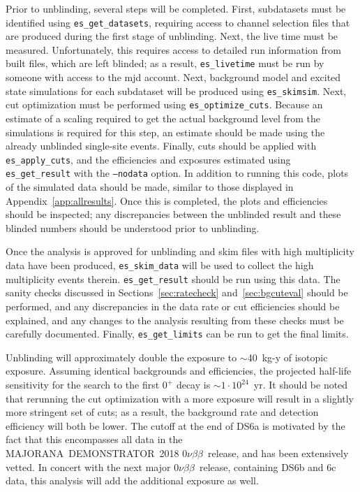 \documentclass[notitlepage,rmp,aps,10pt]{revtex4-1}
\newcommand{\MJ}{M{\footnotesize AJORANA}}
\newcommand{\Demo}{D{\footnotesize EMON\-STRAT\-OR}}
\newcommand{\MJD}{\MJ\ \Demo}
\newcommand{\znbb}{${0 \nu \beta \beta}$}
\begin{document}
Prior to unblinding, several steps will be completed.
First, subdatasets must be identified using \texttt{es\_get\_datasets}, requiring access to channel selection files that are produced during the first stage of unblinding.
Next, the live time must be measured. Unfortunately, this requires access to detailed run information from built files, which are left blinded; as a result, \texttt{es\_livetime} must be run by someone with access to the mjd account.
Next, background model and excited state simulations for each subdataset will be produced using \texttt{es\_skimsim}.
Next, cut optimization must be performed using \texttt{es\_optimize\_cuts}.
Because an estimate of a scaling required to get the actual background level from the simulations is required for this step, an estimate should be made using the already unblinded single-site events.
Finally, cuts should be applied with \texttt{es\_apply\_cuts}, and the efficiencies and exposures estimated using \texttt{es\_get\_result} with the \texttt{--nodata} option.
In addition to running this code, plots of the simulated data should be made, similar to those displayed in Appendix~\ref{app:allresults}.
Once this is completed, the plots and efficiencies should be inspected; any discrepancies between the unblinded result and these blinded numbers should be understood prior to unblinding.

Once the analysis is approved for unblinding and skim files with high multiplicity data have been produced, \texttt{es\_skim\_data} will be used to collect the high multiplicity events therein.
\texttt{es\_get\_result} should be run using this data.
The sanity checks discussed in Sections~\ref{sec:ratecheck} and~\ref{sec:bgcuteval} should be performed, and any discrepancies in the data rate or cut efficiencies should be explained, and any changes to the analysis resulting from these checks must be carefully documented.
Finally, \texttt{es\_get\_limits} can be run to get the final limits.

Unblinding will approximately double the exposure to $\sim$40~kg-y of isotopic exposure. Assuming identical backgrounds and efficiencies, the projected half-life sensitivity for the search to the first $0^+$ decay is $\sim1\cdot10^{24}$~yr. It should be noted that rerunning the cut optimization with a more exposure will result in a slightly more stringent set of cuts; as a result, the background rate and detection efficiency will both be lower.
The cutoff at the end of DS6a is motivated by the fact that this encompasses all data in the \MJD\ 2018 \znbb\ release, and has been extensively vetted.
In concert with the next major \znbb\ release, containing DS6b and 6c data, this analysis will add the additional exposure as well.
\end{document}
